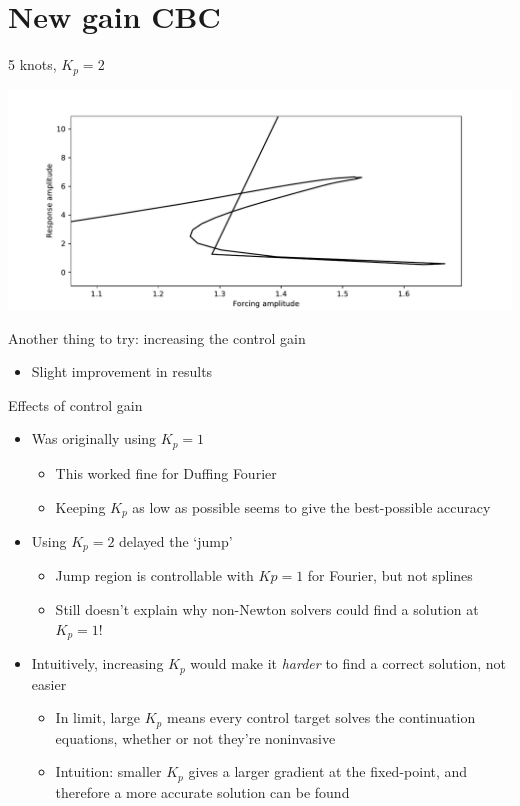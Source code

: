 \documentclass[presentation]{beamer}
\begin{document}
\section{New gain CBC}
\label{sec:orgf00e530}
\begin{frame}[label={sec:orgaad3693},plain]{5 knots, \(K_p = 2\)}
\begin{center}
\includegraphics[width=.9\linewidth]{./5_knots_cbc_kp_2.pdf}
\end{center}

Another thing to try: increasing the control gain
\begin{itemize}
\item Slight improvement in results
\end{itemize}
\end{frame}

\begin{frame}[label={sec:org73ce33b}]{Effects of control gain}
\begin{itemize}
\item Was originally using \(K_p = 1\)
\begin{itemize}
\item This worked fine for Duffing Fourier
\item Keeping \(K_p\) as low as possible seems to give the best-possible accuracy
\end{itemize}
\end{itemize}
\vfill
\begin{itemize}
\item Using \(K_p = 2\) delayed the `jump'
\begin{itemize}
\item Jump region is controllable with \(Kp=1\) for Fourier, but not splines
\item Still doesn't explain why non-Newton solvers could find a solution at \(K_p=1\)!
\end{itemize}
\end{itemize}
\vfill
\begin{itemize}
\item Intuitively, increasing \(K_p\) would make it \emph{harder} to find a correct solution, not easier
\begin{itemize}
\item In limit, large \(K_p\) means every control target solves the continuation equations, whether or not they're noninvasive
\item Intuition: smaller \(K_p\) gives a larger gradient at the fixed-point, and therefore a more accurate solution can be found
\end{itemize}
\end{itemize}
\end{frame}
\end{document}
